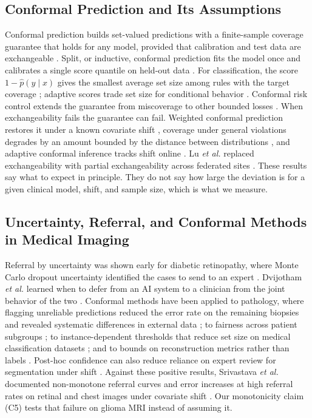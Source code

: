 \documentclass[journal]{IEEEtran}
\begin{document}
\subsection{Conformal Prediction and Its Assumptions}
Conformal prediction builds set-valued predictions with a finite-sample coverage guarantee that holds for any model, provided that calibration and test data are exchangeable \cite{vovk2005}. Split, or inductive, conformal prediction fits the model once and calibrates a single score quantile on held-out data \cite{papadopoulos2002,lei2018}. For classification, the score $1-\hat p(y\mid x)$ gives the smallest average set size among rules with the target coverage \cite{sadinle2019}; adaptive scores trade set size for conditional behavior \cite{romano2020,angelopoulos2021raps}. Conformal risk control extends the guarantee from miscoverage to other bounded losses \cite{angelopoulos2024crc}. When exchangeability fails the guarantee can fail. Weighted conformal prediction restores it under a known covariate shift \cite{tibshirani2019}, coverage under general violations degrades by an amount bounded by the distance between distributions \cite{barber2023}, and adaptive conformal inference tracks shift online \cite{gibbs2021}. Lu \emph{et al.} replaced exchangeability with partial exchangeability across federated sites \cite{lu2023}. These results say what to expect in principle. They do not say how large the deviation is for a given clinical model, shift, and sample size, which is what we measure.

\subsection{Uncertainty, Referral, and Conformal Methods in Medical Imaging}
Referral by uncertainty was shown early for diabetic retinopathy, where Monte Carlo dropout uncertainty identified the cases to send to an expert \cite{leibig2017}. Dvijotham \emph{et al.} learned when to defer from an AI system to a clinician from the joint behavior of the two \cite{dvijotham2023}. Conformal methods have been applied to pathology, where flagging unreliable predictions reduced the error rate on the remaining biopsies and revealed systematic differences in external data \cite{olsson2022}; to fairness across patient subgroups \cite{lu2022fair}; to instance-dependent thresholds that reduce set size on medical classification datasets \cite{hirsch2024}; and to bounds on reconstruction metrics rather than labels \cite{cheung2024}. Post-hoc confidence can also reduce reliance on expert review for segmentation under shift \cite{borges2024}. Against these positive results, Srivastava \emph{et al.} documented non-monotone referral curves and error increases at high referral rates on retinal and chest images under covariate shift \cite{srivastava2023}. Our monotonicity claim (C5) tests that failure on glioma MRI instead of assuming it.
\end{document}
